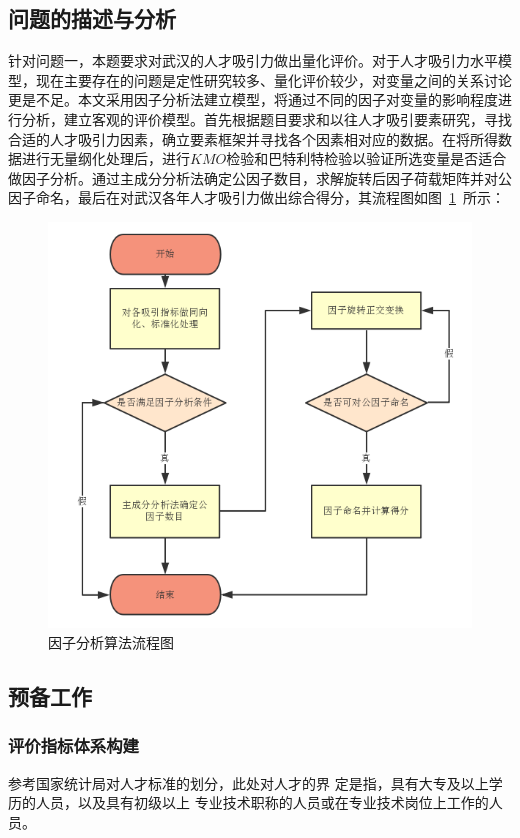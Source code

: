 \documentclass{whutmod}
\begin{document}
	\subsection{问题的描述与分析}

	针对问题一，本题要求对武汉的人才吸引力做出量化评价。对于人才吸引力水平模型，现在主要存在的问题是定性研究较多、量化评价较少，对变量之间的关系讨论更是不足。本文采用因子分析法建立模型，将通过不同的因子对变量的影响程度进行分析，建立客观的评价模型。首先根据题目要求和以往人才吸引要素研究，寻找合适的人才吸引力因素，确立要素框架并寻找各个因素相对应的数据。在将所得数据进行无量纲化处理后，进行$KMO$检验和巴特利特检验以验证所选变量是否适合做因子分析。通过主成分分析法确定公因子数目，求解旋转后因子荷载矩阵并对公因子命名，最后在对武汉各年人才吸引力做出综合得分，其流程图如图~\ref{llll}~所示：


	\begin{figure}[H]
		\centering
		\includegraphics[width=\textwidth]{figures/1111.png}
		\caption{因子分析算法流程图}\label{llll}
	\end{figure}

		\subsection{预备工作}
		\subsubsection{评价指标体系构建}
		参考国家统计局对人才标准的划分，此处对人才的界 定是指，具有大专及以上学历的人员，以及具有初级以上 专业技术职称的人员或在专业技术岗位上工作的人员。
		
\end{document}
